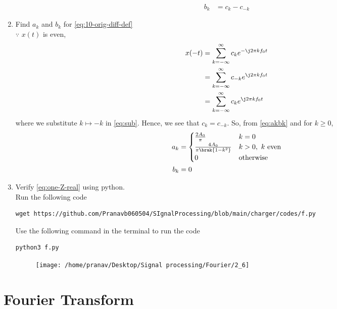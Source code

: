 \documentclass[journal,12pt,twocolumn]{IEEEtran}
\renewcommand\thesection{\arabic{section}}
\begin{document}
\begin{enumerate}[label=\thesection.\arabic*,ref=\thesection.\theenumi]
\begin{align}
    b_k &= c_k - c_{-k}
    \label{eq:akbk}
\end{align}
\item Find $a_k$ and $b_k$ for 
	\eqref{eq:10-orig-diff-def}\\
	\solution $\because$  $x(t)$ is even,
\begin{align}
    x(-t) &= \sum_{k = -\infty}^{\infty}c_ke^{-\j2\pi kf_0 t} \\
          &= \sum_{k = -\infty}^{\infty}c_{-k}e^{\j2\pi kf_0t} \label{eq:sub} \\
          &= \sum_{k = -\infty}^{\infty}c_ke^{\j2\pi kf_0 t}
\end{align}
where we substitute $k \mapsto -k$ in \eqref{eq:sub}. Hence, we see that 
$c_k = c_{-k}$. So, from \eqref{eq:akbk} and for $k \ge 0$,
\begin{align}
    a_k &= 
    \begin{cases}
        \frac{2A_0}{\pi} & k = 0 \\
        \frac{4A_0}{\pi\brak{1 - k^2}} & k > 0,\ k\ \text{even} \\
        0 & \text{otherwise}
    \end{cases} \\
    b_k &= 0
    \label{eq:akbk-even}
\end{align}
\item Verify 
\eqref{eq:one-Z-real}
using python.\\
\solution
			Run the following code 
\begin{lstlisting}
wget https://github.com/Pranavb060504/SIgnalProcessing/blob/main/charger/codes/f.py
\end{lstlisting}
Use the following command in the terminal to run the code
\begin{lstlisting}
python3 f.py
\end{lstlisting}
	    \begin{figure}[!ht]
			\centering
			\texttt{[image: /home/pranav/Desktop/Signal processing/Fourier/2\_6]}
			\caption{}
			\label{fig:f1}
\end{figure}
\end{enumerate}
\section{Fourier Transform}
 
\end{document}

